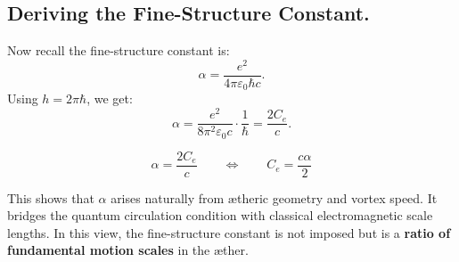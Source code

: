 \subsection{Deriving the Fine-Structure Constant.}
Now recall the fine-structure constant is:
\begin{equation*}
    \alpha = \frac{e^2}{4 \pi \varepsilon_0 \hbar c}.
\end{equation*}
Using \( h = 2\pi \hbar \), we get:
\begin{equation*}
    \alpha = \frac{e^2}{8 \pi^2 \varepsilon_0 c} \cdot \frac{1}{\hbar} = \frac{2 C_e}{c}.
\end{equation*}

\begin{equation}
    \boxed{
        \alpha = \frac{2 C_e}{c}
    }
    \qquad \Leftrightarrow \qquad
    \boxed{
        C_e = \frac{c \alpha}{2}
    }
\end{equation}

This shows that \( \alpha \) arises naturally from ætheric geometry and vortex speed. It bridges the quantum circulation condition with classical electromagnetic scale lengths. In this view, the fine-structure constant is not imposed but is a \textbf{ratio of fundamental motion scales} in the æther.

